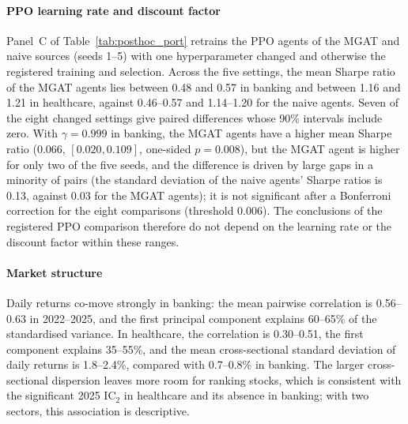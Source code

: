 \documentclass[pdflatex,sn-mathphys-num]{sn-jnl}%
\theoremstyle{thmstyleone}%
\theoremstyle{thmstyletwo}%
\theoremstyle{thmstylethree}%
\begin{document}
{\paragraph{PPO learning rate and discount factor}
Panel~C of Table~\ref{tab:posthoc_port} retrains the PPO agents of the MGAT and naive sources (seeds 1--5) with one hyperparameter changed and otherwise the registered training and selection. Across the five settings, the mean Sharpe ratio of the MGAT agents lies between 0.48 and 0.57 in banking and between 1.16 and 1.21 in healthcare, against 0.46--0.57 and 1.14--1.20 for the naive agents. Seven of the eight changed settings give paired differences whose 90\% intervals include zero. With $\gamma=0.999$ in banking, the MGAT agents have a higher mean Sharpe ratio (0.066, $[0.020, 0.109]$, one-sided $p=0.008$), but the MGAT agent is higher for only two of the five seeds, and the difference is driven by large gaps in a minority of pairs (the standard deviation of the naive agents' Sharpe ratios is 0.13, against 0.03 for the MGAT agents); it is not significant after a Bonferroni correction for the eight comparisons (threshold 0.006). The conclusions of the registered PPO comparison therefore do not depend on the learning rate or the discount factor within these ranges.

\paragraph{Market structure}
Daily returns co-move strongly in banking: the mean pairwise correlation is 0.56--0.63 in 2022--2025, and the first principal component explains 60--65\% of the standardised variance. In healthcare, the correlation is 0.30--0.51, the first component explains 35--55\%, and the mean cross-sectional standard deviation of daily returns is 1.8--2.4\%, compared with 0.7--0.8\% in banking. The larger cross-sectional dispersion leaves more room for ranking stocks, which is consistent with the significant 2025 IC$_2$ in healthcare and its absence in banking; with two sectors, this association is descriptive.\par}
\end{document}
